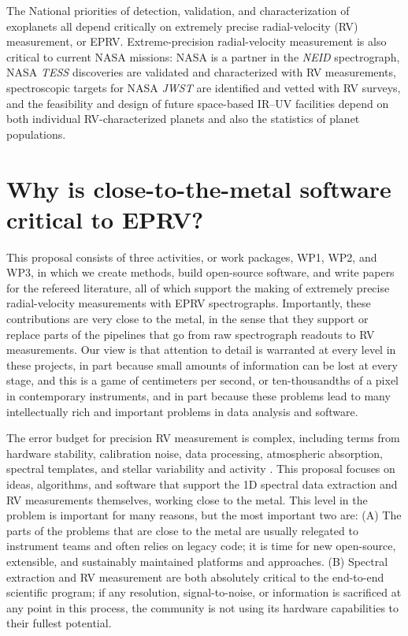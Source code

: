 \documentclass[12pt]{article}
\begin{document}
\noindent
The National priorities of detection, validation, and characterization of exoplanets all depend critically on extremely precise radial-velocity (RV) measurement, or EPRV.
Extreme-precision radial-velocity measurement is also critical to current NASA missions:
NASA is a partner in the \textsl{NEID} spectrograph, NASA \textsl{TESS} discoveries are validated and characterized with RV measurements, spectroscopic targets for NASA \textsl{JWST} are identified and vetted with RV surveys, and the feasibility and design of future space-based IR--UV facilities depend on both individual RV-characterized planets and also the statistics of planet populations.

\section*{Why is close-to-the-metal software critical to EPRV?}

This proposal consists of three activities, or work packages, WP1, WP2, and WP3, in which we create methods, build open-source software, and write papers for the refereed literature, all of which support the making of extremely precise radial-velocity measurements with EPRV spectrographs.
Importantly, these contributions are very close to the metal, in the sense that they support or replace parts of the pipelines that go from raw spectrograph readouts to RV measurements.
Our view is that attention to detail is warranted at every level in these projects, in part because small amounts of information can be lost at every stage, and this is a game of centimeters per second, or ten-thousandths of a pixel in contemporary instruments, and in part because these problems lead to many intellectually rich and important problems in data analysis and software.

The error budget for precision RV measurement is complex, including terms from hardware stability, calibration noise, data processing, atmospheric absorption, spectral templates, and stellar variability and activity \cite[eg,][]{Halverson}. This proposal focuses on ideas, algorithms, and software that support the 1D spectral data extraction and RV measurements themselves, working close to the metal. This level in the problem is important for many reasons, but the most important two are: (A) The parts of the problems that are close to the metal are usually relegated to instrument teams and often relies on legacy code; it is time for new open-source, extensible, and sustainably maintained platforms and approaches. (B) Spectral extraction and RV measurement are both absolutely critical to the end-to-end scientific program; if any resolution, signal-to-noise, or information is sacrificed at any point in this process, the community is not using its hardware capabilities to their fullest potential.
\end{document}
